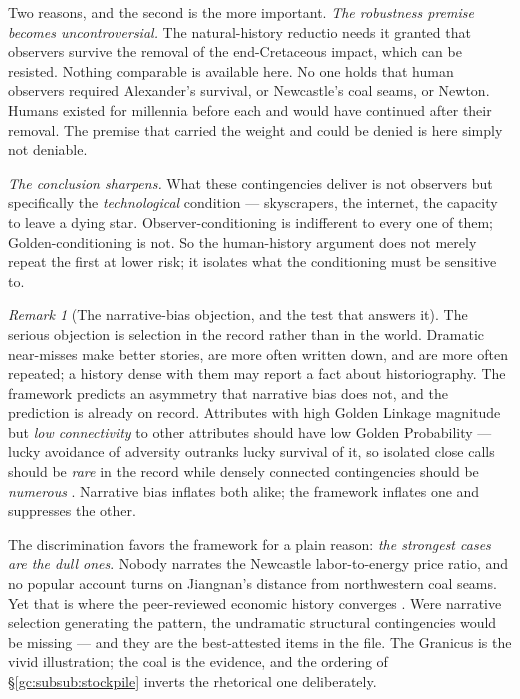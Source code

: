 \documentclass[11pt]{article}
\numberwithin{equation}{section}
\theoremstyle{plain}
\theoremstyle{definition}
\theoremstyle{remark}
\newtheorem{remark}[theorem]{Remark}
\begin{document}
Two reasons, and the second is the more important. \emph{The robustness premise becomes uncontroversial.} The natural-history
reductio needs it granted that observers survive the removal of the
end-Cretaceous impact, which can be resisted. Nothing comparable is
available here. No one holds that human observers required Alexander's
survival, or Newcastle's coal seams, or Newton. Humans existed for
millennia before each and would have continued after their removal. The
premise that carried the weight and could be denied is here simply not
deniable.

\emph{The conclusion sharpens.} What these contingencies deliver is not
observers but specifically the \emph{technological} condition ---
skyscrapers, the internet, the capacity to leave a dying star.
Observer-conditioning is indifferent to every one of them;
Golden-conditioning is not. So the human-history argument does not merely repeat
the first at lower risk; it isolates what the conditioning must be
sensitive to.

\begin{remark}[The narrative-bias objection, and the test that answers
it]\label{gc:rem:narrativebias}
The serious objection is selection in the record rather than in the
world. Dramatic near-misses make better stories, are more often written
down, and are more often repeated; a history dense with them may report
a fact about historiography. The framework predicts an asymmetry that narrative bias does not, and
the prediction is already on record. Attributes with high Golden Linkage
magnitude but \emph{low connectivity} to other attributes should have
low Golden Probability --- lucky avoidance of adversity outranks lucky
survival of it, so isolated close calls should be \emph{rare} in the
record while densely connected contingencies should be
\emph{numerous} \cite{GoldenScience22}. Narrative bias inflates both
alike; the framework inflates one and suppresses the other.

The discrimination favors the framework for a plain reason: \emph{the strongest cases are the dull ones}. Nobody narrates
the Newcastle labor-to-energy price ratio, and no popular account turns
on Jiangnan's distance from northwestern coal seams. Yet that is where
the peer-reviewed economic history converges \cite{Pomeranz00,
Allen09}. Were narrative selection generating the pattern, the
undramatic structural contingencies would be missing --- and they are
the best-attested items in the file. The Granicus is the vivid
illustration; the coal is the evidence, and the ordering of
\S\ref{gc:subsub:stockpile} inverts the rhetorical one deliberately.
\end{remark}
\end{document}

